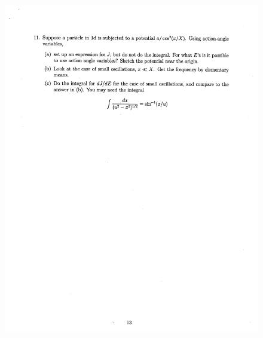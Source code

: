 \documentclass[10pt,a4paper]{article}
\begin{document}
\begin{figure}[H]
 \centering
 \includegraphics[width=16cm]{pdf/1-1T45.png}
\end{figure}
 \newpage
\end{document}

